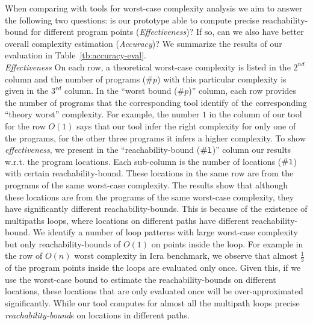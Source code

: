 When comparing with tools for worst-case
complexity analysis we aim to answer the following two questions: is our prototype able to compute precise reachability-bound for different program points (\emph{Effectiveness})? If so, can we also have better overall complexity estimation (\emph{Accuracy})?
We summarize the results of our evaluation in Table~\ref{tb:accuracy-eval}.
\\
\emph{Effectiveness}
\newcommand{\pointnum}{\kw{\# l}}
On each row, a theoretical worst-case complexity is listed in the $2^{nd}$ column and the number of programs ($\# p$) with this particular complexity is given in the $3^{rd}$ column.
In the ``worst bound ($\# p$)'' column, each row provides the number of programs that the corresponding tool identify of the  corresponding ``theory worst'' complexity. For example, the number $1$ in the column of our tool for the row $O(1)$ says that our tool infer the right complexity for only one of the programs, for the other three programs it infers a higher complexity.
To show \textit{effectiveness}, 
we present in the ``{reachability-bound ($\pointnum$)}'' column our results w.r.t. the program locations. 
Each sub-column is the number of locations ($\pointnum$) with certain reachability-bound.
These locations in the same row are from the programs of the same worst-case complexity.
The results show that although these locations are from the programs of the same worst-case complexity, they have significantly different reachability-bounds. This is because of the existence of multipaths loops, where locations on different paths have different reachability-bound.
We identify a number of loop patterns with large worst-case complexity but only reachability-bounds of $O(1)$ on points inside the loop.
For example in the row of $O(n)$ worst complexity in Icra benchmark, we observe that
almost $\frac{1}{3}$ of the program points inside the loops are evaluated only once.
Given this, if we use the worst-case bound to estimate the reachability-bounds on different locations, these locations that are only evaluated once will be over-approximated significantly. 
While our tool computes for almost all the multipath loops precise \emph{reachability-bound}s on locations in different paths.
